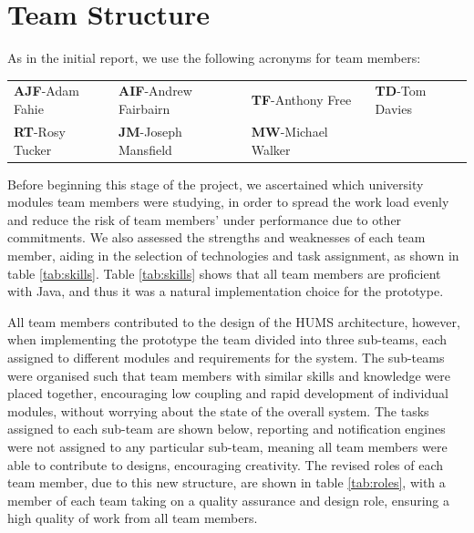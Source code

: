 \section{Team Structure}
\label{sec:team}

As in the initial report, we use the following acronyms for team members:

\begin{tabular}{ p{3cm} p{4cm} p{3.5cm} p{3.5cm} }
  \textbf{AJF}-Adam Fahie &
  \textbf{AIF}-Andrew Fairbairn &
  \textbf{TF}-Anthony Free &
  \textbf{TD}-Tom Davies \\
    \textbf{RT}-Rosy Tucker &
  \textbf{JM}-Joseph Mansfield &
  \textbf{MW}-Michael Walker \\
\end{tabular}

Before beginning this stage of the project, we ascertained which university modules team members were studying, in order to spread the work load evenly and reduce the risk of team members' under performance due to other commitments. We also assessed the strengths and weaknesses of each team member, aiding in the selection of technologies and task assignment, as shown in table \ref{tab:skills}. Table \ref{tab:skills} shows that all team members are proficient with Java, and thus it was a natural implementation choice for the prototype.

All team members contributed to the design of the HUMS architecture, however, when implementing the prototype the team divided into three sub-teams, each assigned to different modules and requirements for the system.
The sub-teams were organised such that team members with similar skills and knowledge were placed together, encouraging low coupling and rapid development of individual modules, without worrying about the state of the overall system. The tasks assigned to each sub-team are shown below, reporting and notification engines were not assigned to any particular sub-team, meaning all team members were able to contribute to designs, encouraging creativity. The revised roles of each team member, due to this new structure, are shown in table \ref{tab:roles}, with a member of each team taking on a quality assurance and design role, ensuring a high quality of work from all team members.

